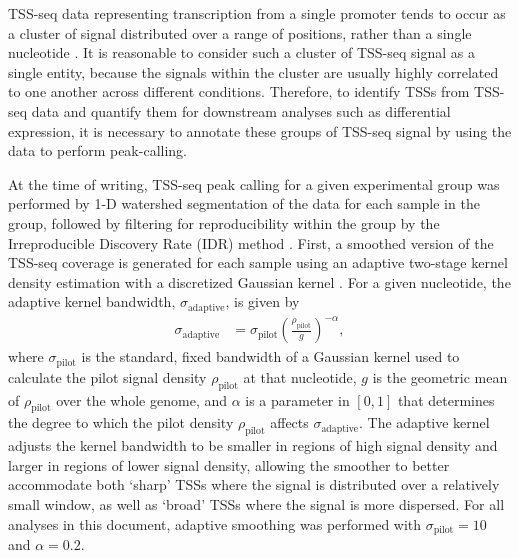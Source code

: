 TSS-seq data representing transcription from a single promoter tends to occur as a cluster of signal distributed over a range of positions, rather than a single nucleotide \citep{arribere2013, malabat2015}.
It is reasonable to consider such a cluster of TSS-seq signal as a single entity, because the signals within the cluster are usually highly correlated to one another across different conditions.
Therefore, to identify TSSs from TSS-seq data and quantify them for downstream analyses such as differential expression, it is necessary to annotate these groups of TSS-seq signal by using the data to perform peak-calling.

At the time of writing, TSS-seq peak calling for a given experimental group was performed by 1-D watershed segmentation of the data for each sample in the group, followed by filtering for reproducibility within the group by the Irreproducible Discovery Rate (IDR) method \citep{li2011}.
First, a smoothed version of the TSS-seq coverage is generated for each sample using an adaptive two-stage kernel density estimation with a discretized Gaussian kernel \citep{silverman1986}.
For a given nucleotide, the adaptive kernel bandwidth, $\sigma_{\text{adaptive}}$, is given by
\begin{align*}
    \sigma_{\text{adaptive}} &= \sigma_\text{pilot} \left( \frac{\rho_{\text{pilot}}}{g} \right)^{-\alpha},
\end{align*}
where $\sigma_\text{pilot}$ is the standard, fixed bandwidth of a Gaussian kernel used to calculate the pilot signal density $\rho_\text{pilot}$ at that nucleotide, $g$ is the geometric mean of $\rho_\text{pilot}$ over the whole genome, and $\alpha$ is a parameter in $[0,1]$ that determines the degree to which the pilot density $\rho_\text{pilot}$ affects $\sigma_\text{adaptive}$.
The adaptive kernel adjusts the kernel bandwidth to be smaller in regions of high signal density and larger in regions of lower signal density, allowing the smoother to better accommodate both `sharp' TSSs where the signal is distributed over a relatively small window, as well as `broad' TSSs where the signal is more dispersed.
For all analyses in this document, adaptive smoothing was performed with $\sigma_\text{pilot} = 10$ and $\alpha = 0.2$.

